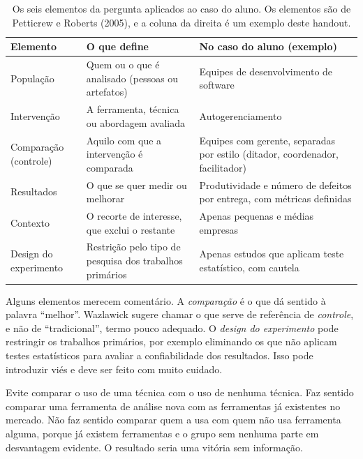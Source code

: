 \documentclass[10pt,a4paper]{extarticle}
\theoremstyle{definition}
\begin{document}
\begin{table}[h]
\centering
\small
\renewcommand{\arraystretch}{1.2}
\begin{tabularx}{\textwidth}{@{}l L L@{}}
\toprule
Elemento & O que define & No caso do aluno (exemplo) \\
\midrule
População & Quem ou o que é analisado (pessoas ou artefatos) & Equipes de desenvolvimento de software \\
Intervenção & A ferramenta, técnica ou abordagem avaliada & Autogerenciamento \\
Comparação (controle) & Aquilo com que a intervenção é comparada & Equipes com gerente, separadas por estilo (ditador, coordenador, facilitador) \\
Resultados & O que se quer medir ou melhorar & Produtividade e número de defeitos por entrega, com métricas definidas \\
Contexto & O recorte de interesse, que exclui o restante & Apenas pequenas e médias empresas \\
Design do experimento & Restrição pelo tipo de pesquisa dos trabalhos primários & Apenas estudos que aplicam teste estatístico, com cautela \\
\bottomrule
\end{tabularx}
\caption{Os seis elementos da pergunta aplicados ao caso do aluno. Os elementos são de Petticrew e Roberts (2005), e a coluna da direita é um exemplo deste handout.}
\label{tab:seis}
\end{table}

Alguns elementos merecem comentário. A \emph{comparação} é o que dá sentido à palavra \enquote{melhor}. Wazlawick sugere chamar o que serve de referência de \emph{controle}, e não de \enquote{tradicional}, termo pouco adequado. O \emph{design do experimento} pode restringir os trabalhos primários, por exemplo eliminando os que não aplicam testes estatísticos para avaliar a confiabilidade dos resultados. Isso pode introduzir viés e deve ser feito com muito cuidado.

\begin{warnbox}
Evite comparar o uso de uma técnica com o uso de nenhuma técnica. Faz sentido comparar uma ferramenta de análise nova com as ferramentas já existentes no mercado. Não faz sentido comparar quem a usa com quem não usa ferramenta alguma, porque já existem ferramentas e o grupo sem nenhuma parte em desvantagem evidente. O resultado seria uma vitória sem informação.
\end{warnbox}
\end{document}
